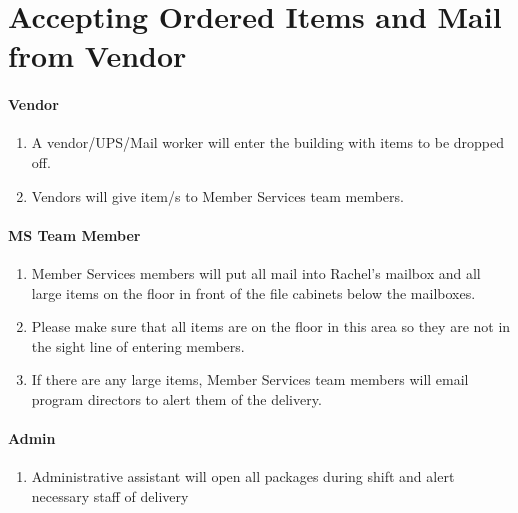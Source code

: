 \documentclass[
]{report}
\providecommand{\tightlist}{%
  \setlength{\itemsep}{0pt}\setlength{\parskip}{0pt}}\usepackage{longtable,booktabs,array}
\begin{document}
\hypertarget{accepting-ordered-items-and-mail-from-vendor}{%
\chapter{Accepting Ordered Items and Mail from
Vendor}\label{accepting-ordered-items-and-mail-from-vendor}}

\hypertarget{vendor}{%
\subsubsection{Vendor}\label{vendor}}

\begin{enumerate}
\def\labelenumi{\arabic{enumi}.}
\item
  A vendor/UPS/Mail worker will enter the building with items to be
  dropped off.
\item
  Vendors will give item/s to Member Services team members.
\end{enumerate}

\hypertarget{ms-team-member}{%
\subsubsection{MS Team Member}\label{ms-team-member}}

\begin{enumerate}
\def\labelenumi{\arabic{enumi}.}
\setcounter{enumi}{2}
\item
  Member Services members will put all mail into Rachel's mailbox and
  all large items on the floor in front of the file cabinets below the
  mailboxes.
\item
  Please make sure that all items are on the floor in this area so they
  are not in the sight line of entering members.
\item
  If there are any large items, Member Services team members will email
  program directors to alert them of the delivery.
\end{enumerate}

\hypertarget{admin}{%
\subsubsection{Admin}\label{admin}}

\begin{enumerate}
\def\labelenumi{\arabic{enumi}.}
\setcounter{enumi}{5}
\tightlist
\item
  Administrative assistant will open all packages during shift and alert
  necessary staff of delivery
\end{enumerate}
\end{document}
